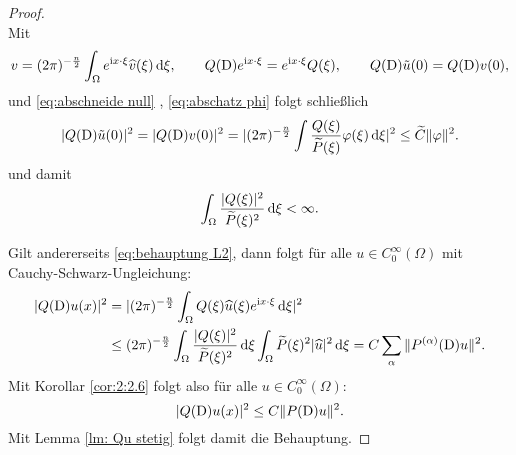 \begin{proof}
\begin{equation}
\end{equation}
Mit
\begin{equation}
v = (2 \pi)^{-\frac{n}{2}} \int_{\Omega} e^{\mathrm i x \cdot \xi} \widehat{v}(\xi) \,\mathrm d \xi, \qquad Q(\mathrm D)e^{\mathrm i x \cdot \xi} = e^{\mathrm i x \cdot \xi} Q(\xi), \qquad Q(\mathrm D)\tilde{u}(0) = Q(\mathrm D)v(0),
\end{equation}
und \eqref{eq:abschneide null} , \eqref{eq:abschatz phi} folgt schließlich
\begin{equation}
|Q(\mathrm D)\tilde{u}(0)|^2 = |Q(\mathrm D)v(0)|^2 = |(2 \pi)^{-\frac{n}{2}} \int \frac{Q(\xi)}{\widetilde{P}(\xi)} \varphi(\xi) \,\mathrm d \xi |^2 \leq \widetilde{C} \Vert \varphi \Vert^2.
\end{equation}
und damit
\begin{equation}\label{eq:behauptung L2}
\int_{\Omega} \frac{|Q(\xi)|^2}{\widetilde{P}(\xi)^2} \,\mathrm d \xi < \infty.
\end{equation}

Gilt andererseits \eqref{eq:behauptung L2}, dann folgt für alle $u \in C_0^{\infty}(\Omega)$ mit Cauchy-Schwarz-Ungleichung:
\begin{align}
|Q(\mathrm D)u(x)|^2 &=  |(2 \pi)^{-\frac{n}{2}} \int_{\Omega} Q(\xi) \widehat{u}(\xi) e^{\mathrm i x \cdot \xi} \,\mathrm d \xi |^2 
\\ & \leq (2 \pi)^{-\frac{n}{2}} \int_{\Omega} \frac{|Q(\xi)|^2}{\widetilde{P}(\xi)^2} \,\mathrm d \xi \int_{\Omega} \widetilde{P}(\xi)^2 | \widehat{u}|^2 \,\mathrm d \xi = C \sum_{\alpha} \Vert P^{(\alpha)}(\mathrm D)u\Vert^2.
\end{align}
Mit Korollar \ref{cor:2:2.6} folgt also für alle $u \in C_0^{\infty}(\Omega)$:
\begin{equation}
|Q(\mathrm D)u(x)|^2 \leq C \Vert P(\mathrm D)u\Vert^2.
\end{equation}
Mit Lemma \ref{lm: Qu stetig} folgt damit die Behauptung.
\end{proof}

